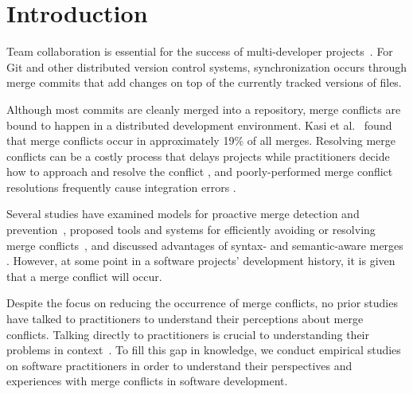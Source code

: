
\section{Introduction}\label{introduction}


Team collaboration is essential for the success of multi-developer projects~\cite{hattori2010syde}.
For Git and other distributed version control systems, synchronization occurs through merge commits that add changes on top of the currently tracked versions of files.

Although most commits are cleanly merged into a repository, merge conflicts are bound to happen in a distributed development environment.
Kasi et al.~\cite{cassandra} found that merge conflicts occur in approximately 19\% of all merges.
Resolving merge conflicts can be a costly process that delays projects while practitioners decide how to approach and resolve the conflict \cite{cassandra}, and poorly-performed merge conflict resolutions frequently cause integration errors \cite{bird-branches-conflict}.

Several studies have examined models for proactive merge detection and prevention~\cite{Brun2011, palantir, Guimaraes}, proposed tools and systems for efficiently avoiding or resolving merge conflicts~\cite{nishimura}\cite{mens2002state}, and discussed advantages of syntax- and semantic-aware merges \cite{danny_refactorings}\cite{hunt2002extensible}. However, at some point in a software projects' development history, it is given that a merge conflict will occur. 

Despite the focus on reducing the occurrence of merge conflicts, no prior studies have talked to practitioners to understand their perceptions about merge conflicts.
Talking directly to practitioners is crucial to understanding their problems in context~\cite{fritz2010using, sillito2006questions, de2008answering, ko2007information}.
To fill this gap in knowledge, we conduct empirical studies on software practitioners in order to understand their perspectives and experiences with merge conflicts in software development.

